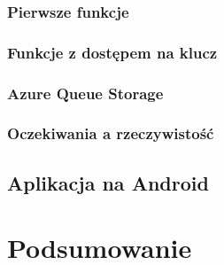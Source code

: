 \documentclass[12pt,a4paper,twoside,titlepage,openright]{book}
\begin{document}


\subsection{Pierwsze funkcje}


\subsection{Funkcje z dostępem na klucz}


\subsection{Azure Queue Storage}


\subsection{Oczekiwania a rzeczywistość}


\section{Aplikacja na Android}






\chapter*{Podsumowanie}
 
 
 
 
\listoffigures

\listoftables



\printbibliography
 
\end{document}
